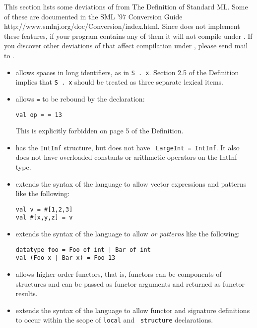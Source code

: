 
This section lists some deviations of {\smlnj} from The Definition of
Standard ML.  Some of these are documented in the 
\htmladdnormallink
  {SML '97 Conversion Guide}
  {http://www.smlnj.org/doc/Conversion/index.html}.
Since {\mlton} does not implement these features, if your program
contains any of them it will not compile under {\mlton}.  If you discover
other deviations of {\smlnj} that affect compilation under {\mlton},
please send mail to {\mltonmail}.

\begin{itemize}
\item
{\smlnj} allows spaces in long identifiers, as in {\tt S . x}.
Section 2.5 of the Definition implies that {\tt S . x} should be
treated as three separate lexical items.

\item
{\smlnj} allows {\tt =} to be rebound by the declaration:
\begin{verbatim}
val op = = 13
\end{verbatim}
This is explicitly forbidden on page 5 of the Definition.

\item
{\smlnj} has the {\tt IntInf} structure, but does not have {\tt
LargeInt = IntInf}.  It also does not have overloaded constants or
arithmetic operators on the IntInf type.

\item
{\smlnj} extends the syntax of the language to allow
vector expressions and patterns like the following:
\begin{verbatim}
val v = #[1,2,3]
val #[x,y,z] = v
\end{verbatim}

\item 
{\smlnj} extends the syntax of the language to allow {\em or patterns}
like the following:
\begin{verbatim}
datatype foo = Foo of int | Bar of int
val (Foo x | Bar x) = Foo 13
\end{verbatim}

\item
{\smlnj} allows higher-order functors, that is, functors can be
components of structures and can be passed as functor arguments and
returned as functor results. 

\item
{\smlnj} extends the syntax of the language to allow functor and
signature definitions to occur within the scope of {\tt local} and {\tt
structure} declarations.


\end{itemize}
